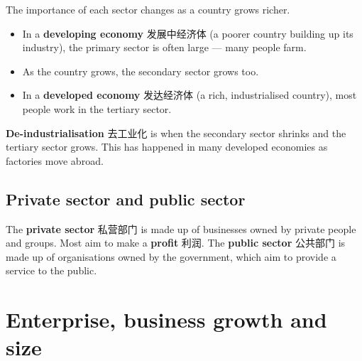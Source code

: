 \documentclass[11pt]{article}
\begin{document}
The importance of each sector changes as a country grows richer.

\begin{itemize}
\item In a \textbf{developing economy} 发展中经济体 (a poorer country building up its industry), the primary sector is often large — many people farm.

\item As the country grows, the secondary sector grows too.

\item In a \textbf{developed economy} 发达经济体 (a rich, industrialised country), most people work in the tertiary sector.

\end{itemize}

\textbf{De-industrialisation} 去工业化 is when the secondary sector shrinks and the tertiary sector grows. This has happened in many developed economies as factories move abroad.

\subsection*{Private sector and public sector}

The \textbf{private sector} 私营部门 is made up of businesses owned by private people and groups. Most aim to make a \textbf{profit} 利润. The \textbf{public sector} 公共部门 is made up of organisations owned by the government, which aim to provide a service to the public.

\begin{center}
\end{center}

\section*{Enterprise, business growth and size}
\end{document}
